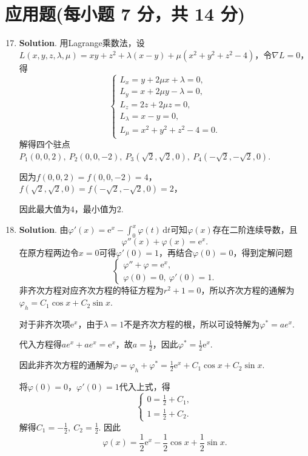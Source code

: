 \documentclass[../main.tex]{subfiles}
\begin{document}
\section{应用题(每小题 7 分，共 14 分)}
\begin{enumerate}
    \setcounter{enumi}{16}
    \item \textbf{Solution}. 用Lagrange乘数法，设$L(x,y,z,\lambda,\mu)=xy+z^2+\lambda(x-y)+\mu(x^2+y^2+z^2-4)$，令$\nabla L=0$，得
          \[
              \begin{cases}
                  L_x=y+2\mu x+\lambda=0, \\
                  L_y=x+2\mu y-\lambda=0, \\
                  L_z=2z+2\mu z=0,        \\
                  L_\lambda=x-y=0,        \\
                  L_\mu=x^2+y^2+z^2-4=0.
              \end{cases}
          \]
          解得四个驻点$P_1(0,0,2),\ P_2(0,0,-2),\ P_3\left(\sqrt{2},\sqrt{2},0\right),\ P_4\left(-\sqrt{2},-\sqrt{2},0\right)$.

          因为$f\left(0,0,2\right)=f(0,0,-2)=4$，$f\left(\sqrt{2},\sqrt{2},0\right)=f\left(-\sqrt{2},-\sqrt{2},0\right)=2$，

          因此最大值为$4$，最小值为$2$.

    \item \textbf{Solution}. 由$\varphi'(x)=\mathrm{e}^x-\int_{0}^{x}\varphi(t)\,\mathrm{d}t$可知$\varphi(x)$存在二阶连续导数，且
          \[
              \varphi''(x)+\varphi(x)=\mathrm{e}^x.
          \]
          在原方程两边令$x=0$可得$\varphi'(0)=1$，再结合$\varphi(0)=0$，得到定解问题
          \[
              \begin{cases}
                  \varphi''+\varphi=\mathrm{e}^x, \\
                  \varphi(0)=0,\ \varphi'(0)=1.
              \end{cases}
          \]
          非齐次方程对应齐次方程的特征方程为$r^2+1=0$，所以齐次方程的通解为$\varphi_h=C_1\cos x+C_2\sin x$.

          对于非齐次项$\mathrm{e}^x$，由于$\lambda=1$不是齐次方程的根，所以可设特解为$\varphi^*=ae^x$.

          代入方程得$ae^x+ae^x=\mathrm{e}^x$，故$a=\frac{1}{2}$，因此$\varphi^*=\frac{1}{2}\mathrm{e}^x$.

          因此非齐次方程的通解为$\varphi=\varphi_h+\varphi^*=\frac{1}{2}\mathrm{e}^x+C_1\cos x+C_2\sin x$.

          将$\varphi(0)=0$，$\varphi'(0)=1$代入上式，得
          \[
              \begin{cases}
                  0=\frac{1}{2}+C_1, \\[6pt]
                  1=\frac{1}{2}+C_2.
              \end{cases}
          \]
          解得$C_1=-\frac{1}{2},\ C_2=\frac{1}{2}$. 因此
          \[
              \varphi(x)=\frac{1}{2}\mathrm{e}^x-\frac{1}{2}\cos x+\frac{1}{2}\sin x.
          \]

\end{enumerate}
\end{document}
